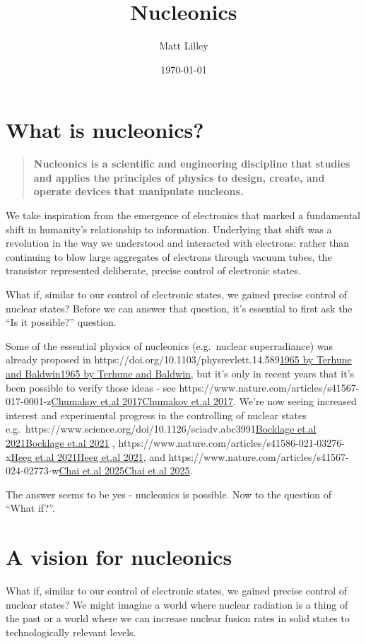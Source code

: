 \documentclass[
]{article}
\title{Nucleonics}
\author{Matt Lilley}
\date{\today}  %
\let\oldhref\href
\renewcommand{\href}[2]{\ifx#1\urlprefix\oldhref{#1}{#2}\else\uline{\oldhref{#1}{#2}}\fi}
\renewcommand{\[}{\begin{equation}}
\renewcommand{\]}{\end{equation}}
\begin{document}
\maketitle

\section{What is nucleonics?}\label{what-is-nucleonics}

\begin{quote}
\textbf{Nucleonics is a scientific and engineering discipline that
studies and applies the principles of physics to design, create, and
operate devices that manipulate nucleons.}
\end{quote}

We take inspiration from the emergence of electronics that marked a
fundamental shift in humanity's relationship to information. Underlying
that shift was a revolution in the way we understood and interacted with
electrons: rather than continuing to blow large aggregates of electrons
through vacuum tubes, the transistor represented deliberate, precise
control of electronic states.

What if, similar to our control of electronic states, we gained precise
control of nuclear states? Before we can answer that question, it's
essential to first ask the ``Is it possible?'' question.

Some of the essential physics of nucleonics (e.g.~nuclear superradiance)
was already proposed in
\href{https://doi.org/10.1103/physrevlett.14.589}{1965 by Terhune and
Baldwin}, but it's only in recent years that it's been possible to
verify those ideas - see
\href{https://www.nature.com/articles/s41567-017-0001-z}{Chumakov et.al
2017}. We're now seeing increased interest and experimental progress in
the controlling of nuclear states
e.g.~\href{https://www.science.org/doi/10.1126/sciadv.abc3991}{Bocklage
et.al 2021} ,
\href{https://www.nature.com/articles/s41586-021-03276-x}{Heeg et.al
2021}, and
\href{https://www.nature.com/articles/s41567-024-02773-w}{Chai et.al
2025}.

The answer seems to be yes - nucleonics is possible. Now to the question
of ``What if?''.

\section{A vision for nucleonics}\label{a-vision-for-nucleonics}

What if, similar to our control of electronic states, we gained precise
control of nuclear states? We might imagine a world where nuclear
radiation is a thing of the past or a world where we can increase
nuclear fusion rates in solid states to technologically relevant levels.
\end{document}
